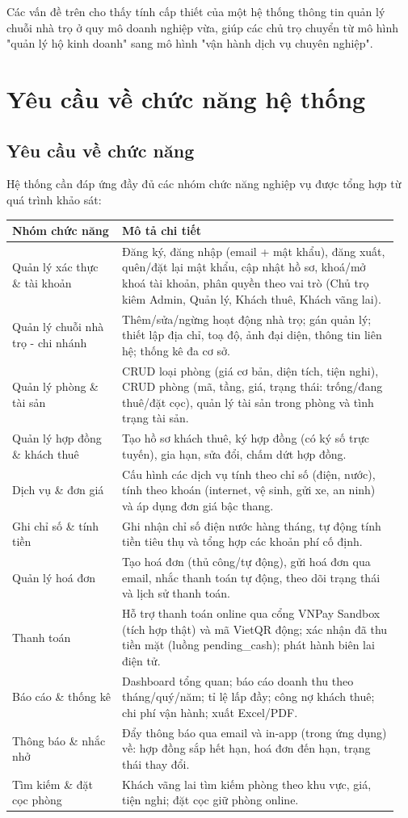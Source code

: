 Các vấn đề trên cho thấy tính cấp thiết của một hệ thống thông tin quản
lý chuỗi nhà trọ ở quy mô doanh nghiệp vừa, giúp các chủ trọ chuyển từ
mô hình "quản lý hộ kinh doanh" sang mô hình "vận hành dịch vụ chuyên
nghiệp".

\section{Yêu cầu về chức năng hệ thống}

\subsection{Yêu cầu về chức năng}

Hệ thống cần đáp ứng đầy đủ các nhóm chức năng nghiệp vụ được tổng hợp
từ quá trình khảo sát:

\begin{longtable}[]{@{}>{\RaggedRight\arraybackslash}p{0.27\linewidth}>{\RaggedRight\arraybackslash}p{0.68\linewidth}@{}}
\toprule
\textbf{Nhóm chức năng} & \textbf{Mô tả chi tiết}\tabularnewline
\midrule
\endhead
Quản lý xác thực \& tài khoản & Đăng ký, đăng nhập (email + mật khẩu),
đăng xuất, quên/đặt lại mật khẩu, cập nhật hồ sơ, khoá/mở khoá tài
khoản, phân quyền theo vai trò (Chủ trọ kiêm Admin, Quản lý, Khách thuê,
Khách vãng lai).\tabularnewline
Quản lý chuỗi nhà trọ - chi nhánh & Thêm/sửa/ngừng hoạt động nhà trọ;
gán quản lý; thiết lập địa chỉ, toạ độ, ảnh đại diện, thông tin liên hệ;
thống kê đa cơ sở.\tabularnewline
Quản lý phòng \& tài sản & CRUD loại phòng (giá cơ bản, diện tích, tiện
nghi), CRUD phòng (mã, tầng, giá, trạng thái: trống/đang thuê/đặt cọc),
quản lý tài sản trong phòng và tình trạng tài sản.\tabularnewline
Quản lý hợp đồng \& khách thuê & Tạo hồ sơ khách thuê, ký hợp đồng (có
ký số trực tuyến), gia hạn, sửa đổi, chấm dứt hợp đồng.\tabularnewline
Dịch vụ \& đơn giá & Cấu hình các dịch vụ tính theo chỉ số (điện, nước),
tính theo khoán (internet, vệ sinh, gửi xe, an ninh) và áp dụng đơn giá
bậc thang.\tabularnewline
Ghi chỉ số \& tính tiền & Ghi nhận chỉ số điện nước hàng tháng, tự động
tính tiền tiêu thụ và tổng hợp các khoản phí cố định.\tabularnewline
Quản lý hoá đơn & Tạo hoá đơn (thủ công/tự động), gửi hoá đơn qua email,
nhắc thanh toán tự động, theo dõi trạng thái và lịch sử thanh
toán.\tabularnewline
Thanh toán & Hỗ trợ thanh toán online qua cổng VNPay Sandbox (tích hợp
thật) và mã VietQR động; xác nhận đã thu tiền mặt (luồng pending\_cash);
phát hành biên lai điện tử.\tabularnewline
Báo cáo \& thống kê & Dashboard tổng quan; báo cáo doanh thu theo
tháng/quý/năm; tỉ lệ lấp đầy; công nợ khách thuê; chi phí vận hành; xuất
Excel/PDF.\tabularnewline
Thông báo \& nhắc nhở & Đẩy thông báo qua email và in-app (trong ứng
dụng) về: hợp đồng sắp hết hạn, hoá đơn đến hạn, trạng thái thay
đổi.\tabularnewline
Tìm kiếm \& đặt cọc phòng & Khách vãng lai tìm kiếm phòng theo khu vực,
giá, tiện nghi; đặt cọc giữ phòng online.\tabularnewline
\bottomrule
\end{longtable}

